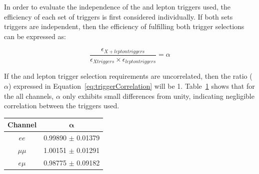 In order to evaluate the independence of the \MET and lepton triggers used, the efficiency of each set of triggers is first considered individually.
If both sets triggers are independent, then the efficiency of fulfilling both trigger selections can be expressed as:

\begin{equation}
\frac{\epsilon_{X + lepton triggers}}{\epsilon_{X triggers} \times \epsilon_{lepton triggers}} = \alpha
\label{eq:triggerCorrelation}
\end{equation}

If the \MET and lepton trigger selection requirements are uncorrelated, then the ratio ($\alpha$) expressed in Equation~\ref{eq:triggerCorrelation} will be 1.
Table~\ref{tab:triggerCorrelation} shows that for the all channels, $\alpha$ only exhibits small differences from unity, indicating negligible correlation between the triggers used.

\begin{table}[htbp]
\label{tab:triggerCorrelation}
  \centering
 \begin{tabular}{cc}
   \hline
   \textbf{Channel} & $\bm{\alpha}$   \\
   \hline   
   $ee$ & 0.99890 $\pm$ 0.01379\\
   $\mu\mu$ & 1.00151 $\pm$ 0.01291\\
   $e \mu$ & 0.98775 $\pm$ 0.09182\\
   \hline
 \end{tabular}%
\end{table}



